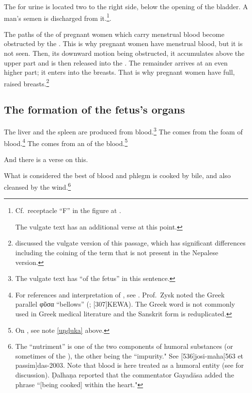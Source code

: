 \begin{translation}
The  for urine is located two  to the right side, below the opening of the bladder. A man's
semen is discharged from it.\footnote{Cf.\ receptacle “F” in the
    figure at \cite[236]{wuja-2008a}.
    
    The vulgate text has an additional
    verse at this point.}.

\item[24]

The paths of the  of pregnant women which carry
menstrual blood become obstructed by the . This is
why pregnant women have menstrual blood, but it is not seen. Then, its
downward motion being obstructed, it accumulates above the upper part
and is then released into the . %
The remainder arrives at an even higher part; it enters into the
breasts. %
That is why pregnant women have full, raised
breasts.\footnote{\citet[81--82]{das-2003} discussed the vulgate
    version of this passage, which has significant differences
    including the coining of the term  that is not present
    in the Nepalese version.}


\subsection{The formation of the fetus's organs}

\item[25]

The liver and the spleen are produced from blood.\footnote{The vulgate
    text has  “of the fetus” in this sentence.}  The
     comes from the foam of blood.\footnote{For
        references and interpretation of , see \cite[271,
        n.\,23, 276, n.\,31]{wuja-2003}.  Prof.\ Zysk noted the Greek parallel
        \textgreek{φῦσα} “bellows” (\cite[1700a]{lidd-1901};
        [307]{KEWA}).  The Greek word is not commonly used in Greek
        medical literature and the Sanskrit form is reduplicated.}  The
         comes from an  of
        the blood.\footnote{On , see note \ref{uṇḍuka} above.}
        
\item[26]
And there is a verse on this.
\begin{sloka}    
What is considered the best  of blood and
phlegm is cooked by bile, and also cleansed by the wind.\footnote{The
     “nutriment” is one of the two components of humoral
    substances (or sometimes of the ), the other
    being the  “impurity."  See
    [536]{josi-maha}{}[563 et passim]{das-2003}. Note that
    blood is here treated as a humoral entity (see \cite{meul-1991} for
    discussion). %
    Ḍalhaṇa reported that the commentator Gayadāsa added the phrase
    “[being cooked] within the heart."}
\end{sloka}


\end{translation}
